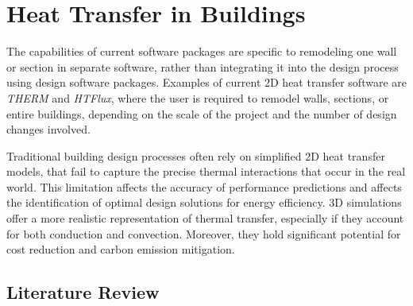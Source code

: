 \chapter{Heat Transfer in Buildings}



The capabilities of current software packages are specific to remodeling one wall or section in separate software, rather than integrating it into the design process using design software packages. Examples of current 2D heat transfer software are \textit{THERM} and \textit{HTFlux}, where
the user is required to remodel walls, sections, or entire buildings, depending on the scale of the project and the number of design changes involved.

Traditional building design processes often rely on simplified 2D heat transfer models, that fail to capture the precise thermal interactions that occur in the real world. This limitation affects the accuracy of performance predictions and affects the identification of optimal design solutions for energy efficiency. 
3D simulations offer a more realistic representation of thermal transfer, especially if they account for both conduction and convection. 
Moreover, they hold significant potential for cost reduction and carbon emission mitigation. 






\section{Literature Review}






